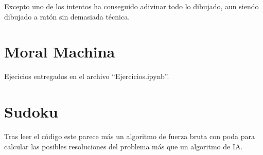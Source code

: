 \documentclass[twoside]{AiTeX}
\begin{document}
Excepto uno de los intentos ha conseguido adivinar todo lo dibujado, aun siendo dibujado a ratón sin demasiada técnica.

\section{Moral Machina}



Ejecicios entregados en el archivo ``Ejercicios.ipynb''.


\section{Sudoku}

Tras leer el código este parece más un algoritmo de fuerza bruta con poda para calcular las posibles resoluciones del problema más que un algoritmo de IA.


\printglossary[title={Glosario}]
\end{document}

